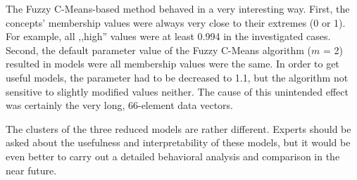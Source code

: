 \documentclass[graybox]{svmult}
\begin{document}
The Fuzzy C-Means-based method behaved in a very interesting way. 
First, the concepts' membership values were always very close to their 
extremes (0 or 1). For example, all ,,high'' values were at least 0.994 
in the investigated cases. Second, the default parameter value of the 
Fuzzy C-Means algorithm ($m$ = 2) resulted in models were all 
membership values were the same. In order to get useful models, the 
parameter had to be decreased to 1.1, but the algorithm not sensitive 
to slightly modified values neither. The cause of this unintended 
effect was certainly the very long, 66-element data vectors.

The clusters of the three reduced models are rather different. Experts 
should be asked about the usefulness and interpretability of these 
models, but it would be even better to carry out a detailed behavioral 
analysis and comparison in the near future. 
\end{document}
